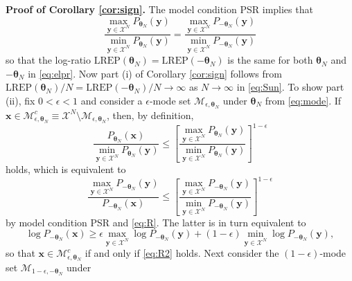 \documentclass[]{article}
\theoremstyle{definition}
\newcommand{\REP}{\mathrm{LREP}}
\begin{document}
\textbf{Proof of Corollary \ref{cor:sign}.} The model condition PSR
implies that
\begin{equation}
\label{eq:R}
\frac{\max_{\boldsymbol y \in \mathcal{X}^N}P_{\boldsymbol \theta_N}(\boldsymbol y)  }{\min_{\boldsymbol y \in \mathcal{X}^N}P_{\boldsymbol \theta_N}(\boldsymbol y) } = \frac{\max_{\boldsymbol y \in \mathcal{X}^N}P_{-\boldsymbol \theta_N}(\boldsymbol y) }{\min_{\boldsymbol y \in \mathcal{X}^N}P_{-\boldsymbol \theta_N}(\boldsymbol y) }
\end{equation}
so that the log-ratio
\(\REP(\boldsymbol \theta_N)=\REP(-\boldsymbol \theta_N)\) is the same
for both \(\boldsymbol \theta_N\) and \(-\boldsymbol \theta_N\) in
\eqref{eq:elpr}. Now part (i) of Corollary \ref{cor:sign} follows from
\(\REP(\boldsymbol \theta_N)/N=\REP(-\boldsymbol \theta_N)/N\to \infty\)
as \(N\to \infty\) in \eqref{eq:Sun}. To show part (ii), fix
\(0 < \epsilon < 1\) and consider a \(\epsilon\)-mode set
\(\mathcal{M}_{\epsilon, \boldsymbol \theta_N}\) under
\(\boldsymbol \theta_N\) from \eqref{eq:mode}. If
\(\boldsymbol x \in \mathcal{M}_{\epsilon, \boldsymbol \theta_N}^c \equiv \mathcal{X}^N \setminus \mathcal{M}_{\epsilon, \boldsymbol \theta_N}\),
then, by definition, \[
\frac{P_{\boldsymbol \theta_N}(\boldsymbol x)}{\min_{\boldsymbol y \in \mathcal{X}^N}P_{\boldsymbol \theta_N}(\boldsymbol y)} \leq \left[\frac{\max_{\boldsymbol y \in \mathcal{X}^N}P_{\boldsymbol \theta_N}(\boldsymbol y)  }{\min_{\boldsymbol y \in \mathcal{X}^N}P_{\boldsymbol \theta_N}(\boldsymbol y) } \right]^{1-\epsilon}
\] holds, which is equivalent to \[
\frac{\max_{\boldsymbol y \in \mathcal{X}^N}P_{-\boldsymbol \theta_N}(\boldsymbol y)}{P_{-\boldsymbol \theta_N}(\boldsymbol x)} \leq
\left[\frac{\max_{\boldsymbol y \in \mathcal{X}^N}P_{-\boldsymbol \theta_N}(\boldsymbol y)  }{\min_{\boldsymbol y \in \mathcal{X}^N}P_{-\boldsymbol \theta_N}(\boldsymbol y) } \right]^{1-\epsilon}
\] by model condition PSR and \eqref{eq:R}. The latter is in turn
equivalent to
\begin{equation}
\label{eq:R2}
\log P_{-\boldsymbol \theta_N}(\boldsymbol x) \geq \epsilon \max\limits_{\boldsymbol y \in \mathcal{X}^N} \log  P_{-\boldsymbol \theta_N}(\boldsymbol y) + (1-\epsilon)\min\limits_{\boldsymbol y \in \mathcal{X}^N} \log P_{-\boldsymbol \theta_N}(\boldsymbol y),
\end{equation}
so that
\(\boldsymbol x \in \mathcal{M}_{\epsilon, \boldsymbol \theta_N}^c\) if
and only if \eqref{eq:R2} holds. Next consider the \((1-\epsilon)\)-mode
set \(\mathcal{M}_{1-\epsilon, -\boldsymbol \theta_N}\) under
\end{document}
